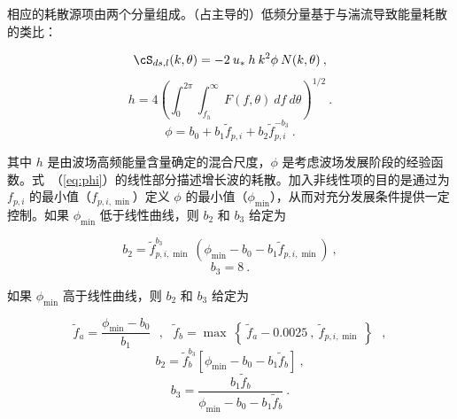 相应的耗散源项由两个分量组成。（占主导的）低频分量基于与湍流导致能量耗散的类比：


\begin{equation}
\cS_{ds,l}(k,\theta) = -2 \: u_{\ast} \: h \: k^2 \phi
\: N(k,\theta) \: , \label{eq:TCdl}
\end{equation} \begin{equation}
h = 4\left(\int_{0}^{2\pi} \int_{f_h}^{\infty} \: F(f,\theta) \:
d f \: d\theta \right)^{1/2} \: . \label{eq:h} \end{equation} \begin{equation}
\phi = b_0 + b_1 \tilde{f}_{p,i}  + b_2 \tilde{f}_{p,i} ^{- b_3}
\: . \label{eq:phi} \end{equation}

\noindent
其中 $h$ 是由波场高频能量含量确定的混合尺度，$\phi$ 是考虑波场发展阶段的经验函数。式~（\ref{eq:phi}）的线性部分描述增长波的耗散。加入非线性项的目的是通过为 $f_{p,i}$ 的最小值（$f_{p,i,\min}$）定义 $\phi$ 的最小值（$\phi_{\min}$），从而对充分发展条件提供一定控制。如果 $\phi_{\min}$ 低于线性曲线，则 $b_2$ 和 $b_3$ 给定为


\begin{equation}
b_2 = \tilde{f}_{p,i,\min}^{b_3} \: \left ( \phi_{\min} - b_0
- b_1 \tilde{f}_{p,i,\min} \right ) \: , \label{eq:b_21}
\end{equation} \begin{equation}
b_3 = 8 \: . \label{eq:b_31}
\end{equation}

\noindent
如果 $\phi_{\min}$ 高于线性曲线，则 $b_2$ 和 $b_3$ 给定为


\begin{equation}
\tilde{f}_a = \frac{\phi_{\min} - b_0}{b_1} \:\:\: , \:\:\:
\tilde{f}_b = \max \: \left \{ \: \tilde{f}_a - 0.0025 \: , \:
\tilde{f}_{p,i,\min} \: \right \} \:\:\: , \label{eq:f_a}
\end{equation} \begin{equation}
b_2 = \tilde{f}_b^{b_3} \left [ \phi_{\min} - b_0 -
b_1 \tilde{f}_b \right ] \: , \label{eq:b_22}
\end{equation} \begin{equation}
b_3 = \frac{b_1 \tilde{f}_b}{\phi_{\min} -b_0 -b_1 \tilde{f}_b}
\: . \label{eq:b_32}
\end{equation}

